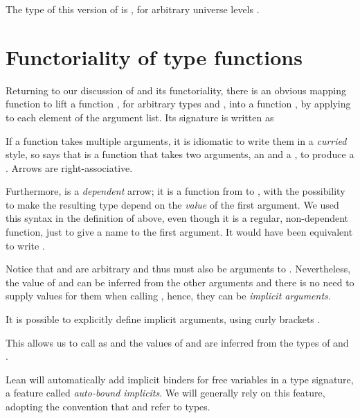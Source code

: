 The type of this version of  is , for arbitrary universe levels .

\section{Functoriality of type functions}

Returning to our discussion of  and its functoriality, there is an obvious mapping function to lift a function , for arbitrary types  and , into a function , by applying  to each element of the argument list. Its signature is written as
\begin{center}
\end{center}

\begin{remark}
    If a function takes multiple arguments, it is idiomatic to write them in a \emph{curried} style,
    so  says that  is a function that takes two arguments, an  and a , to produce a . Arrows are right-associative.

    Furthermore,  is a \emph{dependent} arrow; it is a function from  to , with the possibility to make the resulting type depend on the \emph{value}  of the first argument. 
    We used this syntax in the definition of  above, even though it is a regular, non-dependent function, just to give a name to the first argument. 
    It would have been equivalent to write .

    Notice that  and  are arbitrary and thus must also be arguments to . 
    Nevertheless, the value of  and  can be inferred from the other arguments and there is no need to supply values for them when calling , hence, they can be \emph{implicit arguments}. 
    
    It is possible to explicitly define implicit arguments, using curly brackets .
    \begin{center}
    \end{center}
    This allows us to call  as  and the values of  and  are inferred
    from the types of  and .

    Lean will automatically add implicit binders for free variables in a type signature,
    a feature called \emph{auto-bound implicits}. 
    We will generally rely on this feature, adopting the convention that  and  refer to types.
\end{remark}

